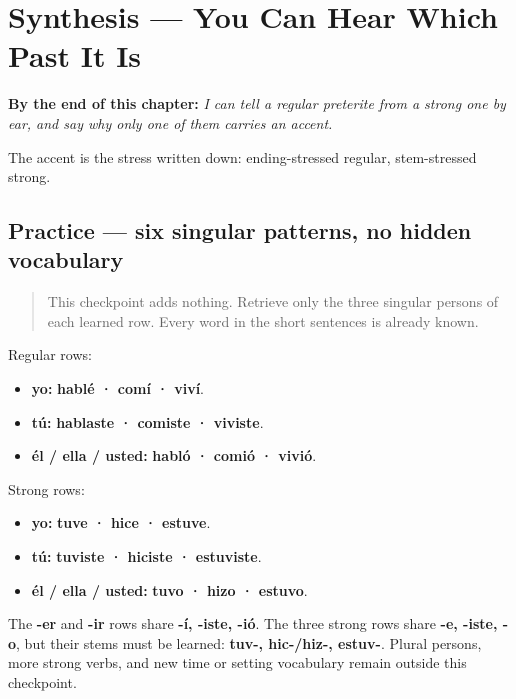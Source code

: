 
\chapter{Synthesis --- You Can Hear Which Past It Is}
\label{ch:spanish-synthesis-preterito}

\begin{chapteropening}
\textbf{By the end of this chapter:} \emph{I can tell a regular preterite from a strong one by ear, and say why only one of them carries an accent.}

The accent is the stress written down: ending-stressed regular, stem-stressed strong.
\end{chapteropening}

\section[Practice]{Practice — six singular patterns, no hidden vocabulary}

\label{lesson:ES-C15-practice}



\begin{quote}
This checkpoint adds nothing. Retrieve only the three singular persons of each learned row. Every word in the short sentences is already known.
\end{quote}

\begin{grammarlens}[title={Grammar Lens: the complete frame for this chapter}]
Regular rows:

\begin{itemize}
\raggedright
  \item \textbf{yo:} \textbf{hablé · comí · viví}.
  \item \textbf{tú:} \textbf{hablaste · comiste · viviste}.
  \item \textbf{él / ella / usted:} \textbf{habló · comió · vivió}.
\end{itemize}

Strong rows:

\begin{itemize}
\raggedright
  \item \textbf{yo:} \textbf{tuve · hice · estuve}.
  \item \textbf{tú:} \textbf{tuviste · hiciste · estuviste}.
  \item \textbf{él / ella / usted:} \textbf{tuvo · hizo · estuvo}.
\end{itemize}

The \textbf{-er} and \textbf{-ir} rows share \textbf{-í, -iste, -ió}. The three strong rows share \textbf{-e, -iste, -o}, but their stems must be learned: \textbf{tuv-, hic-/hiz-, estuv-}. Plural persons, more strong verbs, and new time or setting vocabulary remain outside this checkpoint.
\end{grammarlens}

